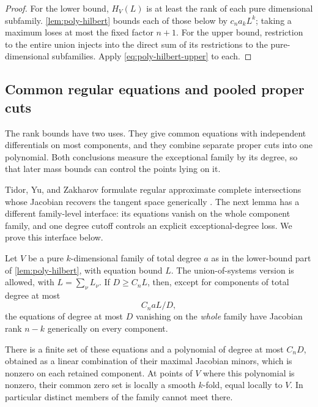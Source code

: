 \begin{proof}
For the lower bound, $H_V(L)$ is at least the rank of each pure dimensional subfamily.  \cref{lem:poly-hilbert} bounds each of those below by $c_na_kL^k$; taking a maximum loses at most the fixed factor $n+1$.  For the upper bound, restriction to the entire union injects into the direct sum of its restrictions to the pure-dimensional subfamilies.  Apply \eqref{eq:poly-hilbert-upper} to each.
\end{proof}

\subsection{Common regular equations and pooled proper cuts}

The rank bounds have two uses.  They give common equations with independent differentials on most components, and they combine separate proper cuts into one polynomial.  Both conclusions measure the exceptional family by its degree, so that later mass bounds can control the points lying on it.

Tidor, Yu, and Zakharov formulate regular approximate complete intersections whose Jacobian recovers the tangent space generically \cite[Theorem~4.1]{tidoryuzakharov2026}.  The next lemma has a different family-level interface: its equations vanish on the whole component family, and one degree cutoff controls an explicit exceptional-degree loss.  We prove this interface below.

\begin{lemma}
\label{lem:poly-regularity}
Let $V$ be a pure $k$-dimensional family of total degree $a$ as in the lower-bound part of \cref{lem:poly-hilbert}, with equation bound $L$. The union-of-systems version is allowed, with $L=\sum_\nu L_\nu$. If $D\ge C_nL$, then, except for components of total degree at most
\begin{equation}\label{eq:poly-regularity-loss}
 C_n aL/D,
\end{equation}
the equations of degree at most $D$ vanishing on the \emph{whole} family have Jacobian rank $n-k$ generically on every component.

There is a finite set of these equations and a polynomial of degree at most $C_nD$, obtained as a linear combination of their maximal Jacobian minors, which is nonzero on each retained component.  At points of $V$ where this polynomial is nonzero, their common zero set is locally a smooth $k$-fold, equal locally to $V$.  In particular distinct members of the family cannot meet there.
\end{lemma}

